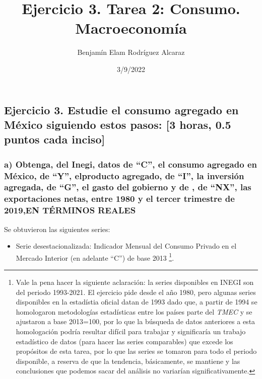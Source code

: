 \documentclass[
]{article}
\title{Ejercicio 3. Tarea 2: Consumo. Macroeconomía}
\author{Benjamín Elam Rodríguez Alcaraz}
\date{3/9/2022}
\providecommand{\tightlist}{%
  \setlength{\itemsep}{0pt}\setlength{\parskip}{0pt}}
\begin{document}
\maketitle

\hypertarget{ejercicio-3.-estudie-el-consumo-agregado-en-muxe9xico-siguiendo-estos-pasos-3-horas-0.5-puntos-cada-inciso}{%
\subsection{Ejercicio 3. Estudie el consumo agregado en México siguiendo
estos pasos: {[}3 horas, 0.5 puntos cada
inciso{]}}\label{ejercicio-3.-estudie-el-consumo-agregado-en-muxe9xico-siguiendo-estos-pasos-3-horas-0.5-puntos-cada-inciso}}

\hypertarget{a-obtenga-del-inegi-datos-de-c-el-consumo-agregado-en-muxe9xico-de-y-elproducto-agregado-de-i-la-inversiuxf3n-agregada-de-g-el-gasto-del-gobierno-y-de-de-nx-las-exportaciones-netas-entre-1980-y-el-tercer-trimestre-de-2019en-tuxe9rminos-reales}{%
\subsubsection{a) Obtenga, del Inegi, datos de ``C'', el consumo
agregado en México, de ``Y'', elproducto agregado, de ``I'', la
inversión agregada, de ``G'', el gasto del gobierno y de , de ``NX'',
las exportaciones netas, entre 1980 y el tercer trimestre de 2019,EN
TÉRMINOS
REALES}\label{a-obtenga-del-inegi-datos-de-c-el-consumo-agregado-en-muxe9xico-de-y-elproducto-agregado-de-i-la-inversiuxf3n-agregada-de-g-el-gasto-del-gobierno-y-de-de-nx-las-exportaciones-netas-entre-1980-y-el-tercer-trimestre-de-2019en-tuxe9rminos-reales}}

Se obtuvieron las siguientes series:

\begin{itemize}
\tightlist
\item
  Serie desestacionalizada: Indicador Mensual del Consumo Privado en el
  Mercado Interior (en adelante ``C'') de base 2013 \footnote{Vale la
    pena hacer la siguiente aclaración: la series disponibles en INEGI
    son del periodo 1993-2021. El ejercicio pide desde el año 1980, pero
    algunas series disponibles en la estadístia oficial datan de 1993
    dado que, a partir de 1994 se homologaron metodologías estadísticas
    entre los países parte del \emph{TMEC} y se ajustaron a base
    2013=100, por lo que la búsqueda de datos anteriores a esta
    homologación podría resultar difícil para trabajar y significaría un
    trabajo estadístico de datos (para hacer las series comparables) que
    excede los propósitos de esta tarea, por lo que las series se
    tomaron para todo el periodo disponible, a reserva de que la
    tendencia, básicamente, se mantiene y las conclusiones que podemos
    sacar del análisis no variarían significativamente.}.
\end{itemize}
\end{document}
